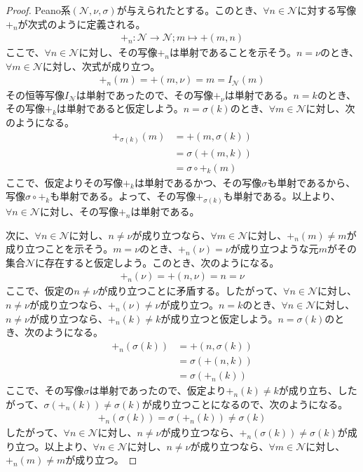 \documentclass[dvipdfmx]{jsarticle}
\begin{document}
\begin{proof}
Peano系$\left( \mathcal{N,}\nu,\sigma \right)$が与えられたとする。このとき、$\forall n \in \mathcal{N}$に対する写像$+_{n}$が次式のように定義される。
\begin{align*}
+_{n}\mathcal{:N \rightarrow N;}m \mapsto + (m,n)
\end{align*}
ここで、$\forall n \in \mathcal{N}$に対し、その写像$+_{n}$は単射であることを示そう。$n = \nu$のとき、$\forall m \in \mathcal{N}$に対し、次式が成り立つ。
\begin{align*}
+_{n}(m) = + (m,\nu) = m = I_{\mathcal{N}}(m)
\end{align*}
その恒等写像$I_{\mathcal{N}}$は単射であったので、その写像$+_{\nu}$は単射である。$n = k$のとき、その写像$+_{k}$は単射であると仮定しよう。$n = \sigma(k)$のとき、$\forall m \in \mathcal{N}$に対し、次のようになる。
\begin{align*}
+_{\sigma(k)}(m) &= + \left( m,\sigma(k) \right)\\
&= \sigma\left( + (m,k) \right)\\
&= \sigma \circ +_{k}(m)
\end{align*}
ここで、仮定よりその写像$+_{k}$は単射であるかつ、その写像$\sigma$も単射であるから、写像$\sigma \circ +_{k}$も単射である。よって、その写像$+_{\sigma(k)}$も単射である。以上より、$\forall n \in \mathcal{N}$に対し、その写像$+_{n}$は単射である。\par
次に、$\forall n \in \mathcal{N}$に対し、$n \neq \nu$が成り立つなら、$\forall m \in \mathcal{N}$に対し、$+_{n}(m) \neq m$が成り立つことを示そう。$m = \nu$のとき、$+_{n}(\nu) = \nu$が成り立つような元$m$がその集合$\mathcal{N}$に存在すると仮定しよう。このとき、次のようになる。
\begin{align*}
+_{n}(\nu) = + (n,\nu) = n = \nu
\end{align*}
ここで、仮定の$n \neq \nu$が成り立つことに矛盾する。したがって、$\forall n \in \mathcal{N}$に対し、$n \neq \nu$が成り立つなら、$+_{n}(\nu) \neq \nu$が成り立つ。$n = k$のとき、$\forall n \in \mathcal{N}$に対し、$n \neq \nu$が成り立つなら、$+_{n}(k) \neq k$が成り立つと仮定しよう。$n = \sigma(k)$のとき、次のようになる。
\begin{align*}
+_{n}\left( \sigma(k) \right) &= + \left( n,\sigma(k) \right)\\
&= \sigma\left( + (n,k) \right)\\
&= \sigma\left( +_{n}(k) \right)
\end{align*}
ここで、その写像$\sigma$は単射であったので、仮定より$+_{n}(k) \neq k$が成り立ち、したがって、$\sigma\left( +_{n}(k) \right) \neq \sigma(k)$が成り立つことになるので、次のようになる。
\begin{align*}
+_{n}\left( \sigma(k) \right) = \sigma\left( +_{n}(k) \right) \neq \sigma(k)
\end{align*}
したがって、$\forall n \in \mathcal{N}$に対し、$n \neq \nu$が成り立つなら、$+_{n}\left( \sigma(k) \right) \neq \sigma(k)$が成り立つ。以上より、$\forall n \in \mathcal{N}$に対し、$n \neq \nu$が成り立つなら、$\forall m \in \mathcal{N}$に対し、$+_{n}(m) \neq m$が成り立つ。
\end{proof}
\end{document}
